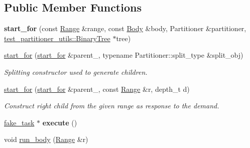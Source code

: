 \subsection*{Public Member Functions}
\begin{DoxyCompactItemize}
\item 
\hypertarget{classtbb_1_1interface7_1_1internal_1_1start__for_a4b68b71d65cfdbceb97cce64b15b3cb5}{}{\bfseries start\+\_\+for} (const \hyperlink{classtbb_1_1blocked__range}{Range} \&range, const \hyperlink{classBody}{Body} \&body, Partitioner \&partitioner, \hyperlink{classtest__partitioner__utils_1_1BinaryTree}{test\+\_\+partitioner\+\_\+utils\+::\+Binary\+Tree} $\ast$tree)\label{classtbb_1_1interface7_1_1internal_1_1start__for_a4b68b71d65cfdbceb97cce64b15b3cb5}

\item 
\hyperlink{classtbb_1_1interface7_1_1internal_1_1start__for_a2f95305a0cf2f6cbda317c03e4f0670e}{start\+\_\+for} (\hyperlink{classtbb_1_1interface7_1_1internal_1_1start__for}{start\+\_\+for} \&parent\+\_\+, typename Partitioner\+::split\+\_\+type \&split\+\_\+obj)
\begin{DoxyCompactList}\small\item\em Splitting constructor used to generate children. \end{DoxyCompactList}\item 
\hyperlink{classtbb_1_1interface7_1_1internal_1_1start__for_ab3dec94136307a1b1d8f0fc371a2b616}{start\+\_\+for} (\hyperlink{classtbb_1_1interface7_1_1internal_1_1start__for}{start\+\_\+for} \&parent\+\_\+, const \hyperlink{classtbb_1_1blocked__range}{Range} \&r, depth\+\_\+t d)
\begin{DoxyCompactList}\small\item\em Construct right child from the given range as response to the demand. \end{DoxyCompactList}\item 
\hypertarget{classtbb_1_1interface7_1_1internal_1_1start__for_ab675fc0183f5aece80b658f923f33ad9}{}\hyperlink{classtbb_1_1fake__task}{fake\+\_\+task} $\ast$ {\bfseries execute} ()\label{classtbb_1_1interface7_1_1internal_1_1start__for_ab675fc0183f5aece80b658f923f33ad9}

\item 
\hypertarget{classtbb_1_1interface7_1_1internal_1_1start__for_a55a62314abf4a685b42a9c2369124926}{}void \hyperlink{classtbb_1_1interface7_1_1internal_1_1start__for_a55a62314abf4a685b42a9c2369124926}{run\+\_\+body} (\hyperlink{classtbb_1_1blocked__range}{Range} \&r)\label{classtbb_1_1interface7_1_1internal_1_1start__for_a55a62314abf4a685b42a9c2369124926}


\end{DoxyCompactItemize}
